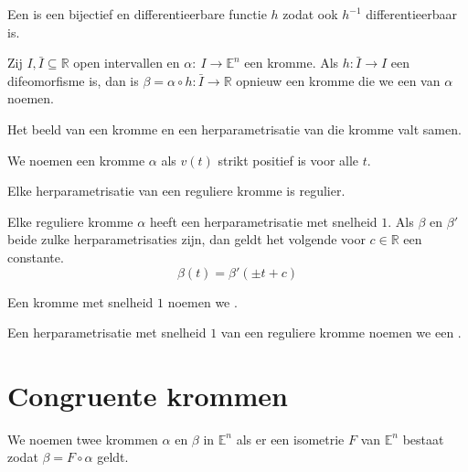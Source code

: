 \documentclass[main.tex]{subfiles}
\begin{document}
\begin{de}
  Een  is een bijectief en differentieerbare functie $h$ zodat ook $h^{-1}$ differentieerbaar is.
\end{de}

\begin{de}
  Zij $I,\bar{I} \subseteq \mathbb{R}$ open intervallen en $\alpha:\ I \rightarrow \mathbb{E}^{n}$ een kromme.
  Als $h: \bar{I} \rightarrow I$ een difeomorfisme is, dan is $\beta = \alpha \circ h: \bar{I} \rightarrow \mathbb{R}$ opnieuw een kromme die we een  van $\alpha$ noemen.
\end{de}

\begin{opm}
  Het beeld van een kromme en een herparametrisatie van die kromme valt samen.
\end{opm}


\begin{de}
  We noemen een kromme $\alpha$  als $v(t)$ strikt positief is voor alle $t$.
\end{de}

\begin{st}
  Elke herparametrisatie van een reguliere kromme is regulier.
\end{st}

\begin{st}
  Elke reguliere kromme $\alpha$ heeft een herparametrisatie met snelheid $1$.
  Als $\beta$ en $\beta'$ beide zulke herparametrisaties zijn, dan geldt het volgende voor $c\in \mathbb{R}$ een constante.
  \[ \beta(t) = \beta'(\pm t + c) \]
\end{st}

\begin{de}
  Een kromme met snelheid $1$ noemen we .
\end{de}
\begin{de}
  Een herparametrisatie met snelheid $1$ van een reguliere kromme noemen we een .
\end{de}

\section{Congruente krommen}
\label{sec:congruente-krommen}

\begin{de}
  We noemen twee krommen $\alpha$ en $\beta$ in $\mathbb{E}^{n}$  als er een isometrie $F$ van $\mathbb{E}^{n}$ bestaat zodat $\beta = F \circ \alpha$ geldt.
\end{de}
\end{document}
